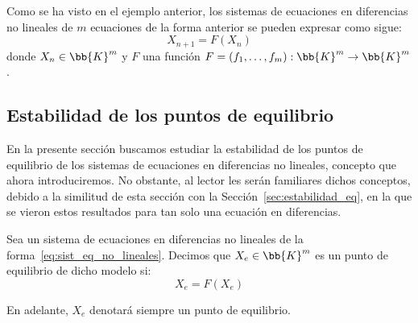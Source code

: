 Como se ha visto en el ejemplo anterior, los sistemas de ecuaciones en diferencias no lineales de $m$ ecuaciones de la forma anterior se pueden expresar como sigue:
\begin{equation}\label{eq:sist_eq_no_lineales}
    X_{n+1} = F(X_n)
\end{equation}
donde $X_{n}\in \bb{K}^m$ y $F$ una función $F=(f_1,\dots, f_m):\bb{K}^m\to \bb{K}^m$.


\subsection{Estabilidad de los puntos de equilibrio}\label{sec:estabilidad_sist_eq}

En la presente sección buscamos estudiar la estabilidad de los puntos de equilibrio de los sistemas de ecuaciones en diferencias no lineales, concepto que ahora introduciremos. No obstante, al lector les serán familiares dichos conceptos, debido a la similitud de esta sección con la Sección~\ref{sec:estabilidad_eq}, en la que se vieron estos resultados para tan solo una ecuación en diferencias.

\begin{definicion}
    Sea un sistema de ecuaciones en diferencias no lineales de la forma~\ref{eq:sist_eq_no_lineales}. Decimos que $X_e\in \bb{K}^m$ es un punto de equilibrio de dicho modelo si:
    \begin{equation*}
        X_e = F(X_e)
    \end{equation*}

    En adelante, $X_e$ denotará siempre un punto de equilibrio.
\end{definicion}

